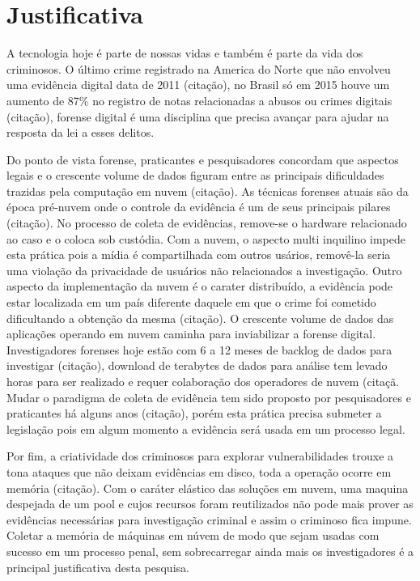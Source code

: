 \documentclass[
	12pt,				%
	openright,			%
	twoside,			%
	a4paper,			%
	english,			%
	french,				%
	spanish,			%
	brazil,				%
	]{abntex2}
\begin{document}
\chapter{Justificativa}

A tecnologia hoje é parte de nossas vidas e também é parte da vida dos criminosos. O último crime registrado na America do Norte que não envolveu uma evidência digital data de 2011
(citação), no Brasil só em 2015 houve um aumento de 87\% no registro de notas relacionadas a abusos ou crimes digitais (citação), forense digital é uma disciplina que precisa avançar
para ajudar na resposta da lei a esses delitos.

\par

Do ponto de vista forense, praticantes e pesquisadores concordam que aspectos legais e o crescente volume de dados figuram entre as principais dificuldades trazidas pela computação 
em nuvem (citação). As técnicas forenses atuais são da época pré-nuvem onde o controle da evidência é um de seus principais pilares (citação). No processo de coleta de evidências, remove-se o 
hardware relacionado ao caso e o coloca sob custódia. Com a nuvem, o aspecto multi inquilino impede esta prática pois a mídia é compartilhada com outros usários, removê-la seria 
uma violação da privacidade de usuários não relacionados a investigação. Outro aspecto da implementação da nuvem é o carater distribuído, a evidência pode estar localizada em um 
país diferente daquele em que o crime foi cometido dificultando a obtenção da mesma (citação). O crescente volume de dados das aplicações operando em nuvem caminha para inviabilizar
a forense digital. Investigadores forenses hoje estão com 6 a 12 meses de backlog de dados para investigar (citação), download de terabytes de dados para análise tem levado horas
 para ser realizado e requer colaboração dos operadores de nuvem (citaçã. Mudar o paradigma de coleta de evidência tem sido proposto por pesquisadores e praticantes há alguns anos (citação), porém esta prática precisa submeter a 
legislação pois em algum momento a evidência será usada em um processo legal.

\par

Por fim, a criatividade dos criminosos para explorar vulnerabilidades trouxe a tona ataques que não deixam evidências em disco, toda a operação ocorre em memória (citação). Com o caráter 
elástico das soluções em nuvem, uma maquina despejada de um pool e cujos recursos foram reutilizados não pode mais prover as evidências necessárias para investigação criminal e 
assim o criminoso fica impune. Coletar a memória de máquinas em núvem de modo que sejam usadas com sucesso em um processo penal, sem sobrecarregar ainda mais os investigadores 
é a principal justificativa desta pesquisa.
\end{document}
